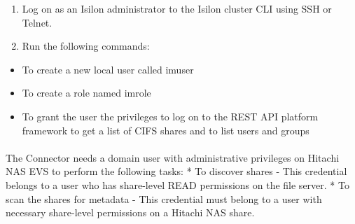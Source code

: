 \documentclass[letterpaper,10pt,english]{sphinxmanual}
\begin{document}
\begin{enumerate}
\item {} 
Log on as an Isilon administrator to the Isilon cluster CLI using SSH or Telnet.

\item {} 
Run the following commands:

\end{enumerate}
\begin{itemize}
\item {} 
To create a new local user called imuser

\end{itemize}
\begin{quote}

\end{quote}
\begin{itemize}
\item {} 
To create a role named imrole

\end{itemize}
\begin{quote}

\end{quote}
\begin{itemize}
\item {} 
To grant the user the privileges to log on to the REST API platform framework to get a list of CIFS shares and to list users and groups

\end{itemize}
\begin{quote}



\end{quote}


\paragraph{}
\label{\detokenize{mcdmp_app_ug:creating-a-domain-user-on-a-hitachi-nas-file-server}}
The Connector needs a domain user with administrative privileges on Hitachi NAS EVS to perform the following tasks:
* To discover shares - This credential belongs to a user who has share-level READ permissions on the file server.
* To scan the shares for metadata - This credential must belong to a user with necessary share-level permissions on a Hitachi NAS share.
\end{document}
